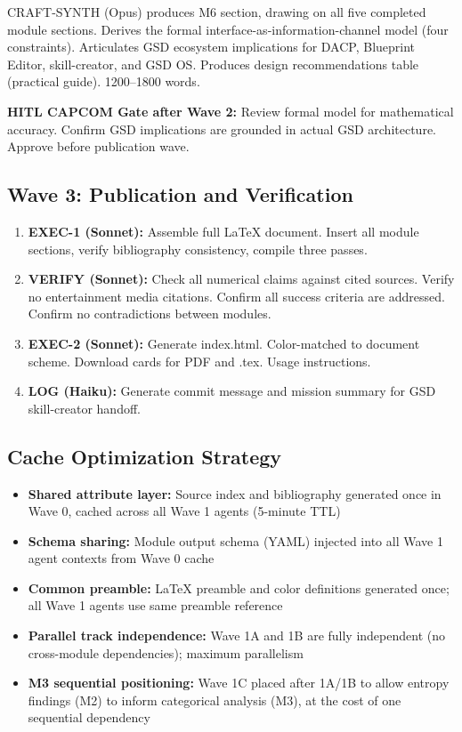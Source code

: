 \documentclass[11pt,letterpaper]{article}
\begin{document}
CRAFT-SYNTH (Opus) produces M6 section, drawing on all five completed module sections. Derives the formal interface-as-information-channel model (four constraints). Articulates GSD ecosystem implications for DACP, Blueprint Editor, skill-creator, and GSD OS. Produces design recommendations table (practical guide). 1200--1800 words.

\textbf{HITL CAPCOM Gate after Wave 2:} Review formal model for mathematical accuracy. Confirm GSD implications are grounded in actual GSD architecture. Approve before publication wave.

\subsection{Wave 3: Publication and Verification}

\begin{enumerate}[leftmargin=2em, itemsep=0.3em]
  \item \textbf{EXEC-1 (Sonnet):} Assemble full LaTeX document. Insert all module sections, verify bibliography consistency, compile three passes.
  \item \textbf{VERIFY (Sonnet):} Check all numerical claims against cited sources. Verify no entertainment media citations. Confirm all success criteria are addressed. Confirm no contradictions between modules.
  \item \textbf{EXEC-2 (Sonnet):} Generate index.html. Color-matched to document scheme. Download cards for PDF and .tex. Usage instructions.
  \item \textbf{LOG (Haiku):} Generate commit message and mission summary for GSD skill-creator handoff.
\end{enumerate}

\subsection{Cache Optimization Strategy}

\begin{itemize}[itemsep=0.3em]
  \item \textbf{Shared attribute layer:} Source index and bibliography generated once in Wave 0, cached across all Wave 1 agents (5-minute TTL)
  \item \textbf{Schema sharing:} Module output schema (YAML) injected into all Wave 1 agent contexts from Wave 0 cache
  \item \textbf{Common preamble:} LaTeX preamble and color definitions generated once; all Wave 1 agents use same preamble reference
  \item \textbf{Parallel track independence:} Wave 1A and 1B are fully independent (no cross-module dependencies); maximum parallelism
  \item \textbf{M3 sequential positioning:} Wave 1C placed after 1A/1B to allow entropy findings (M2) to inform categorical analysis (M3), at the cost of one sequential dependency
\end{itemize}
\end{document}
